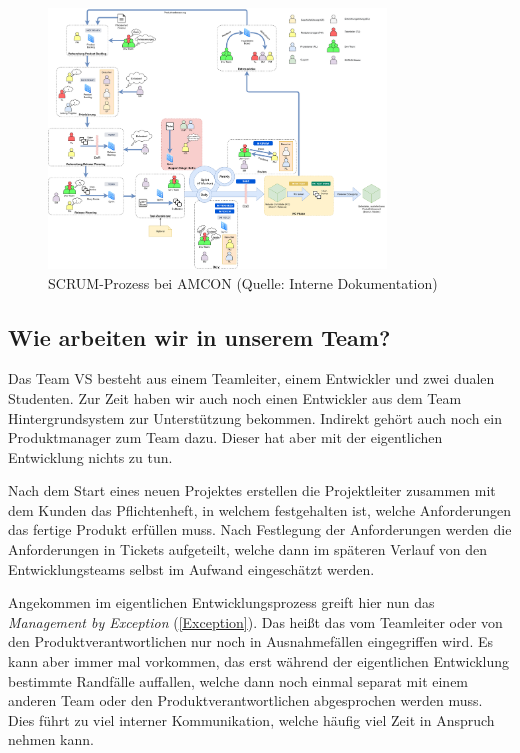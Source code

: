         \begin{figure}
            \centering
            \includegraphics[width = 0.8\textwidth]{Eigene Darstellungen/SCRUM.png}

            \caption{SCRUM-Prozess bei AMCON (Quelle: Interne Dokumentation)} \label{SCRUMProzess}
        \end{figure}

    \subsection{Wie arbeiten wir in unserem Team?} \label{Aktuell Team VS}
        Das Team VS besteht aus einem Teamleiter, einem Entwickler und zwei dualen Studenten. Zur Zeit haben wir auch
        noch einen Entwickler aus dem Team Hintergrundsystem zur Unterstützung bekommen. Indirekt gehört auch noch
        ein Produktmanager zum Team dazu. Dieser hat aber mit der eigentlichen Entwicklung nichts zu tun.

        Nach dem Start eines neuen Projektes erstellen die Projektleiter zusammen mit dem Kunden das Pflichtenheft, in 
        welchem festgehalten ist, welche Anforderungen das fertige Produkt erfüllen muss. Nach Festlegung der 
        Anforderungen werden die Anforderungen in Tickets aufgeteilt, welche dann im späteren Verlauf von den 
        Entwicklungsteams selbst im Aufwand eingeschätzt werden. 

        Angekommen im eigentlichen Entwicklungsprozess greift hier nun das \emph{Management by Exception} 
        (\ref{Exception}). Das heißt das vom Teamleiter oder von den Produktverantwortlichen nur noch in Ausnahmefällen
        eingegriffen wird. Es kann aber immer mal vorkommen, das erst während der eigentlichen Entwicklung bestimmte 
        Randfälle auffallen, welche dann noch einmal separat mit einem anderen Team oder den Produktverantwortlichen
        abgesprochen werden muss. Dies führt zu viel interner Kommunikation, welche häufig viel Zeit in Anspruch nehmen
        kann.
        
